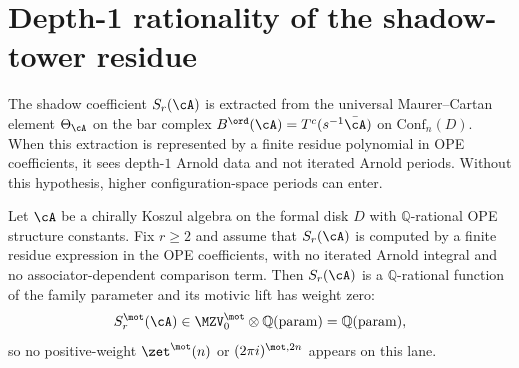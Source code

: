 \section{Depth-1 rationality of the shadow-tower residue}
\label{sec:depth-1-rationality}

The shadow coefficient $S_r(\cA)$ is extracted from the universal
Maurer--Cartan element $\Theta_{\cA}$ on the bar complex
$B^{\ord}(\cA) = T^c(s^{-1} \bar{\cA})$ on $\mathrm{Conf}_n(D)$.
When this extraction is represented by a finite residue polynomial in
OPE coefficients, it sees depth-$1$ Arnold data and not iterated
Arnold periods. Without this hypothesis, higher configuration-space
periods can enter.

\begin{theorem}
\ClaimStatusConditional
Let $\cA$ be a chirally Koszul algebra on the formal disk $D$ with
$\mathbb{Q}$-rational OPE structure constants. Fix $r \geq 2$ and
assume that $S_r(\cA)$ is computed by a finite residue expression in
the OPE coefficients, with no iterated Arnold integral and no
associator-dependent comparison term. Then $S_r(\cA)$ is a
$\mathbb{Q}$-rational function of the family parameter and its motivic
lift has weight zero:
\[
 S_r^{\mot}(\cA) \in
 \MZV^{\mot}_0 \otimes \mathbb{Q}(\mathrm{param})
 =
 \mathbb{Q}(\mathrm{param}),
\]
so no positive-weight $\zet^{\mot}(n)$ or $(2\pi i)^{\mot,2n}$
appears on this lane.
\end{theorem}


